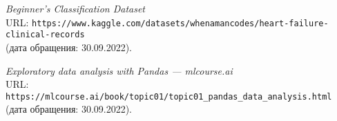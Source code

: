 \begin{thebibliography}{99}
{\itshape Beginner's Classification Dataset}\\
URL: \texttt{https://www.kaggle.com/datasets/whenamancodes/heart-failure-clinical-records}\\
(дата обращения: 30.09.2022).

{\itshape Exploratory data analysis with Pandas --- mlcourse.ai}\\
URL: \texttt{https://mlcourse.ai/book/topic01/topic01\_pandas\_data\_analysis.html}\\
(дата обращения: 30.09.2022).

\end{thebibliography}
\pagebreak
